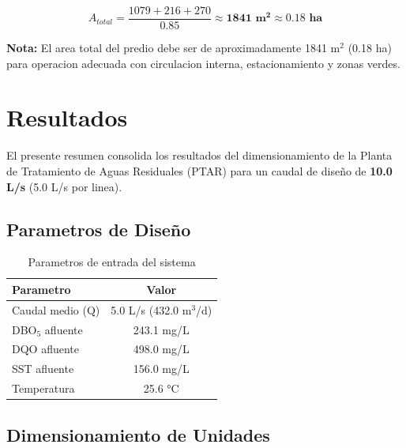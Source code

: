 \documentclass[12pt,a4paper]{article}
\begin{document}
\begin{equation}
A_{total} = \frac{1079 + 216 + 270}{0.85} \approx \mathbf{1841 \text{ m}^2} \approx \mathbf{0.18 \text{ ha}}
\end{equation}

\textbf{Nota:} El area total del predio debe ser de aproximadamente 1841 m$^2$ (0.18 ha) para operacion adecuada con circulacion interna, estacionamiento y zonas verdes.



\newpage
\section{Resultados}

El presente resumen consolida los resultados del dimensionamiento de la Planta de Tratamiento de Aguas Residuales (PTAR) para un caudal de dise\~no de \textbf{10.0 L/s} (5.0 L/s por linea).

\subsection{Parametros de Dise\~no}

\begin{table}[H]
\centering
\caption{Parametros de entrada del sistema}
\begin{tabular}{lc}
\toprule
\textbf{Parametro} & \textbf{Valor} \\
\midrule
Caudal medio (Q) & 5.0 L/s (432.0 m$^3$/d) \\
DBO$_5$ afluente & 243.1 mg/L \\
DQO afluente & 498.0 mg/L \\
SST afluente & 156.0 mg/L \\
Temperatura & 25.6 °C \\
\bottomrule
\end{tabular}
\end{table}

\subsection{Dimensionamiento de Unidades}
\end{document}
